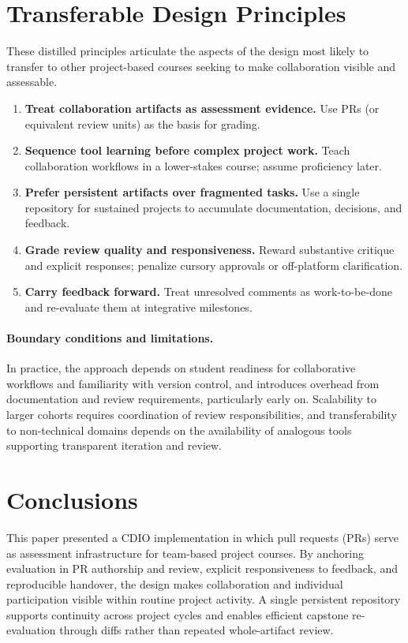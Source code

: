 \section{Transferable Design Principles}
These distilled principles articulate the aspects of the design most likely to transfer to other project-based courses seeking to make collaboration visible and assessable.

\begin{enumerate}
    \item \textbf{Treat collaboration artifacts as assessment evidence.} Use PRs (or equivalent review units) as the basis for grading.
    \item \textbf{Sequence tool learning before complex project work.} Teach collaboration workflows in a lower-stakes course; assume proficiency later.
    \item \textbf{Prefer persistent artifacts over fragmented tasks.} Use a single repository for sustained projects to accumulate documentation, decisions, and feedback.
    \item \textbf{Grade review quality and responsiveness.} Reward substantive critique and explicit responses; penalize cursory approvals or off-platform clarification.
    \item \textbf{Carry feedback forward.} Treat unresolved comments as work-to-be-done and re-evaluate them at integrative milestones.
\end{enumerate}

\paragraph{Boundary conditions and limitations.}
In practice, the approach depends on student readiness for collaborative workflows and familiarity with version control, and introduces overhead from documentation and review requirements, particularly early on. Scalability to larger cohorts requires coordination of review responsibilities, and transferability to non-technical domains depends on the availability of analogous tools supporting transparent iteration and review.

\section{Conclusions}
This paper presented a CDIO implementation in which pull requests (PRs) serve as assessment infrastructure for team-based project courses. By anchoring evaluation in PR authorship and review, explicit responsiveness to feedback, and reproducible handover, the design makes collaboration and individual participation visible within routine project activity. A single persistent repository supports continuity across project cycles and enables efficient capstone re-evaluation through diffs rather than repeated whole-artifact review.

